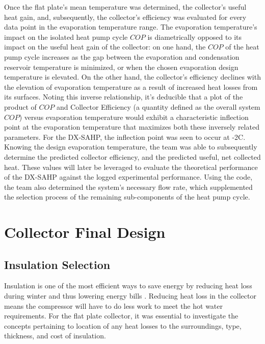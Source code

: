 \medskip
Once the flat plate’s mean temperature was determined, the collector’s useful heat gain, and, subsequently, the collector’s efficiency was evaluated for every data point in the evaporation temperature range. The evaporation temperature’s impact on the isolated heat pump cycle $COP$ is diametrically opposed to its impact on the useful heat gain of the collector: on one hand, the $COP$ of the heat pump cycle increases as the gap between the evaporation and condensation reservoir temperature is minimized, or when the chosen evaporation design temperature is elevated. On the other hand, the collector’s efficiency declines with the elevation of evaporation temperature as a result of increased heat losses from its surfaces. Noting this inverse relationship, it’s deducible that a plot of the product of $COP$ and Collector Efficiency (a quantity defined as the overall system $COP$) versus evaporation temperature would exhibit a characteristic inflection point at the evaporation temperature that maximizes both these inversely related parameters. For the DX-SAHP, the inflection point was seen to occur at -2\textdegree C. Knowing the design evaporation temperature, the team was able to subsequently determine the predicted collector efficiency, and the predicted useful, net collected heat. These values will later be leveraged to evaluate the theoretical performance of the DX-SAHP against the logged experimental performance. Using the code, the team also determined the system’s necessary flow rate, which supplemented the selection process of the remaining sub-components of the heat pump cycle.

\section{Collector Final Design}

\subsection{Insulation Selection}

Insulation is one of the most efficient ways to save energy by reducing heat loss during winter and thus lowering energy bills \cite{insulation}. Reducing heat loss in the collector means the compressor will have to do less work to meet the hot water requirements. For the flat plate collector, it was essential to investigate the concepts pertaining to location of any heat losses to the surroundings, type, thickness, and cost of insulation.

